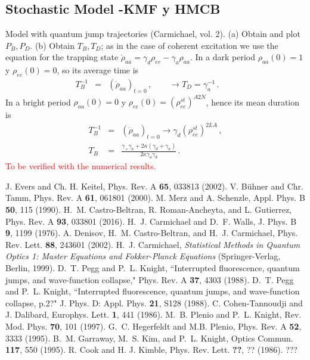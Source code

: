 \documentclass[twocolumn,aps,eqsecnum,showkeys,amsmath]{revtex4-2}
\begin{document}
\subsection{Stochastic Model -KMF y HMCB} 	
Model with quantum jump trajectories (Carmichael, vol. 2). (a) Obtain 
and plot $P_B, P_D$. (b) Obtain $T_B, T_D$; as in the case of 
coherent excitation we use the equation for the trapping state 
$\dot{\rho}_{aa} = \gamma_d \rho_{ee} -\gamma_a \rho_{aa}$. 
In a dark period $\rho_{aa}(0) =1$ y $\rho_{ee}(0) =0$, so its average 
time is 
%
\begin{eqnarray}    
T_B^{-1} &=& (\dot{\rho}_{aa})_{t=0} \,, \qquad \to 
	T_D = \gamma_a^{-1} \,. \qquad 
\end{eqnarray}
In a bright period 
$\rho_{aa}(0) =0$ y $\rho_{ee}(0) = (\rho_{ee}^{st})^{A2N}$, hence its 
mean duration is 
%
\begin{eqnarray}    
T_B^{-1} &=& (\dot{\rho}_{aa})_{t=0} 	\to \gamma_d (\rho_{ee}^{st})^{2LA} \,, 
	\nonumber  \\  
T_B &=& \frac{ \gamma_+ \gamma_a +2\kappa (\gamma_d +\gamma_a) } 
	{ 2\kappa \gamma_a \gamma_d }\,. 
\end{eqnarray}
\textcolor{red}{To be verified with the numerical results.}

\begin{references} %
%
 J. Evers and Ch. H. Keitel, Phys. Rev. A 
\textbf{65}, 033813 (2002). 
%
 V. B\"uhner and Chr. Tamm, Phys. Rev. A 
\textbf{61}, 061801 (2000). 
%
 M. Merz and A. Schenzle, Appl. Phys. B 
\textbf{50}, 115 (1990). 
%
 H.~M. Castro-Beltran, R. Roman-Ancheyta, and 
L. Gutierrez, Phys. Rev. A \textbf{93}, 033801 (2016). 
%
 H.~J. Carmichael and D.~F. Walls, J. Phys. B 
	{\bf 9}, 1199 (1976).
%
 A. Denisov, H.~M. Castro-Beltran, and H.~J. Carmichael, 
	Phys. Rev. Lett. {\bf 88}, 243601 (2002).
%
%
 H.~J. Carmichael, \textit{Statistical Methods in 
Quantum Optics 1: Master Equations and Fokker-Planck Equations} 
(Springer-Verlag, Berlin, 1999).
%
 D.~T. Pegg and P.~L. Knight, ``Interrupted 
fluorescence, quantum jumps, and wave-function collapse," 
Phys. Rev. A \textbf{37}, 4303 (1988). 
%
 D.~T. Pegg and P.~L. Knight, ``Interrupted 
fluorescence, quantum jumps, and wave-function collapse, p.2?" 
J. Phys. D: Appl. Phys. \textbf{21}, S128 (1988). 
%
 C. Cohen-Tannoudji and J. Dalibard, Europhys. Lett. 
\textbf{1}, 441 (1986). 
%
 M.~B. Plenio and P.~L. Knight, Rev. Mod. Phys. 
{\bf 70}, 101 (1997). 
%
 G.~C. Hegerfeldt and M.B. Plenio, Phys. Rev. A 
\textbf{52}, 3333 (1995). 
%
 B.~M. Garraway, M.~S. Kim, and P.~L. Knight, 
	Optics Commun. \textbf{117}, 550 (1995).
%
 R. Cook and H. J. Kimble, Phys. Rev. Lett. 
\textbf{??}, ?? (1986). ???
%


\end{references} %
\end{document}
